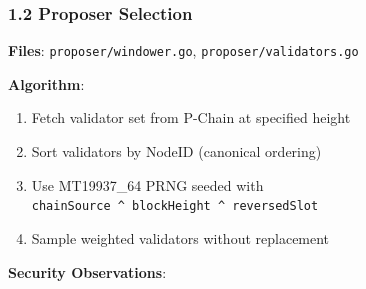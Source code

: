 \documentclass[
]{article}
\providecommand{\tightlist}{%
  \setlength{\itemsep}{0pt}\setlength{\parskip}{0pt}}
\begin{document}
\subsubsection{1.2 Proposer Selection}\label{12-proposer-selection}

\textbf{Files}: \texttt{proposer/windower.go},
\texttt{proposer/validators.go}

\textbf{Algorithm}:

\begin{enumerate}
\def\labelenumi{\arabic{enumi}.}
\tightlist
\item
  Fetch validator set from P-Chain at specified height
\item
  Sort validators by NodeID (canonical ordering)
\item
  Use MT19937\_64 PRNG seeded with
  \texttt{chainSource\ \^{}\ blockHeight\ \^{}\ reversedSlot}
\item
  Sample weighted validators without replacement
\end{enumerate}

\textbf{Security Observations}:
\end{document}
